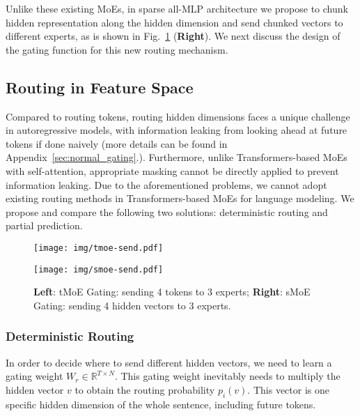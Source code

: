 \documentclass{article}
\begin{document}
Unlike these existing MoEs, in sparse all-MLP architecture we propose to chunk hidden representation along the hidden dimension and send chunked vectors to different experts, as is shown in Fig.~\ref{fig:moe_smoe} (\textbf{Right}). 
We next discuss the design of the gating function for this new routing mechanism. 

\subsection{Routing in Feature Space}
\label{subsec:routing_challenges}
Compared to routing tokens, routing hidden dimensions faces a unique challenge in autoregressive models, with information leaking from looking ahead at future tokens if done naively (more details can be found in Appendix~\ref{sec:normal_gating}.). Furthermore, unlike Transformers-based MoEs with self-attention, appropriate masking cannot be directly applied to prevent information leaking. Due to the aforementioned problems, we cannot adopt existing routing methods in Transformers-based MoEs for language modeling. We propose and compare the following two solutions: deterministic routing and partial prediction. 

\begin{figure}[!t]
   \begin{minipage}{0.24\textwidth}
     \centering
     \texttt{[image: img/tmoe-send.pdf]}
\end{minipage}\hfill
   \begin{minipage}{0.23\textwidth}
     \centering
     \texttt{[image: img/smoe-send.pdf]}
\end{minipage}
   \caption{\textbf{Left}: tMoE Gating: sending 4 tokens to 3 experts; \textbf{Right}: sMoE Gating: sending 4 hidden vectors to 3 experts.}
   \label{fig:moe_smoe}
\end{figure}




\subsubsection{Deterministic Routing}
\label{sec:deterministic routing}

In order to decide where to send different hidden vectors, we need to learn a gating weight $W_r \in \mathbb{R}^{T\times N}$. This gating weight inevitably needs to multiply the hidden vector $v$ to obtain the routing probability $p_i(v)$. This vector is one specific hidden dimension of the whole sentence, including future tokens.
\end{document}
